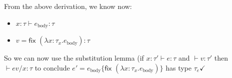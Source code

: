 \documentclass[10pt, oneside]{article}
\begin{document}
\begin{enumerate}
\begin{enumerate}
\begin{prooftree}
			
		\end{prooftree}
		
		From the above derivation, we know now:
		\begin{itemize}
			\item $x: \tau \vdash e_\text{body} :  \tau$
			\item $v = \textsf{fix } (\lambda x: \tau_x.e_\text{body}): \tau$
		\end{itemize}
		
		So we can now use the substitution lemma (if $x:\tau' \vdash e:\tau$ and 
		$\vdash v:\tau'$ then $\vdash e{v/x}: \tau$ to conclude $e' = e_\text{body} 
		\{\textsf{fix } (\lambda x: \tau_x.e_\text{body}) \}$ has type $\tau_e 
		\checkmark$
		
	\end{enumerate}
\end{enumerate}
\end{document}
